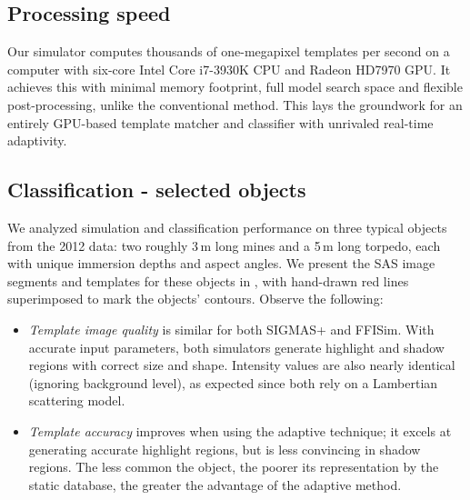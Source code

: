 \subsection{Processing speed}

%


Our simulator computes thousands of one-megapixel templates per second on a computer with six-core Intel Core i7-3930K CPU and Radeon HD7970 GPU. It achieves this with minimal memory footprint, full model search space and flexible post-processing, unlike the conventional method. This lays the groundwork for an entirely GPU-based template matcher and classifier with unrivaled real-time adaptivity.






\subsection{Classification - selected objects}

We analyzed simulation and classification performance on three typical objects from the 2012 data: two roughly 3\,m long mines and a 5\,m long torpedo, each with unique immersion depths and aspect angles. We present the SAS image segments and templates for these objects in , with hand-drawn red lines superimposed to mark the objects' contours. Observe the following:
%
\begin{itemize}
\item \emph{Template image quality} is similar for both SIGMAS+ and FFISim. With accurate input parameters, both simulators generate highlight and shadow regions with correct size and shape. Intensity values are also nearly identical (ignoring background level), as expected since both rely on a Lambertian scattering model.
\item \emph{Template accuracy} improves when using the adaptive technique; it excels at generating accurate highlight regions, but is less convincing in shadow regions. The less common the object, the poorer its representation by the static database, the greater the advantage of the adaptive method.
\end{itemize}



